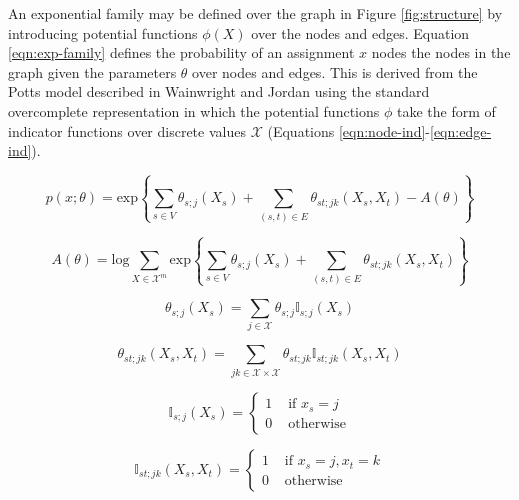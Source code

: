 \documentclass{article} %
\begin{document}
An exponential family may be defined over the graph in Figure \ref{fig:structure} by introducing potential functions $\phi(X)$ over the nodes and edges. Equation \ref{eqn:exp-family} defines the probability of an assignment $x$ nodes the nodes in the graph given the parameters $\theta$ over nodes and edges. This is derived from the Potts model described in Wainwright and Jordan \cite{wainwright08} using the standard overcomplete representation in which the potential functions $\phi$ take the form of indicator functions over discrete values $\mathcal{X}$ (Equations \ref{eqn:node-ind}-\ref{eqn:edge-ind}).

\begin{equation}
\label{eqn:exp-family}
p(x;\theta)
=
\textrm{exp}\left\{\sum_{s \in V}\theta_{s;j}(X_s) + \sum_{(s,t) \in E} \theta_{st;jk}(X_s,X_t) - A(\theta)\right\}
\end{equation}

\begin{equation}
\label{eqn:normalization}
A(\theta)
=
\textrm{log} \sum_{X \in \mathcal{X}^m} \textrm{exp}\left\{\sum_{s \in V}\theta_{s;j}(X_s) + \sum_{(s,t) \in E} \theta_{st;jk}(X_s,X_t)\right\}
\end{equation}

\noindent\begin{minipage}{.4\linewidth}
\begin{equation}
\label{eqn:node-theta}
\theta_{s;j}(X_s) = \sum_{j \in \mathcal{X}} \theta_{s;j} \mathbb{I}_{s;j}(X_s)
\end{equation}
\end{minipage}%
\begin{minipage}{.6\linewidth}
\begin{equation}
\label{eqn:edge-theta}
\theta_{st;jk}(X_s,X_t) = \sum_{jk \in \mathcal{X} \times \mathcal{X}} \theta_{st;jk} \mathbb{I}_{st;jk}(X_s,X_t)
\end{equation}
\end{minipage}

\noindent\begin{minipage}{.4\linewidth}
\begin{equation}
\label{eqn:node-ind}
\mathbb{I}_{s;j}(X_s) = \left\{ \begin{array}{rl}
 1 &\mbox{ if $x_s = j$} \\
 0 &\mbox{ otherwise}
\end{array} \right.
\end{equation}
\end{minipage}%
\begin{minipage}{.6\linewidth}
\begin{equation}
\label{eqn:edge-ind}
\mathbb{I}_{st;jk}(X_s,X_t) = \left\{ \begin{array}{rr}
 1 &\mbox{ if $x_s = j, x_t = k$} \\
 0 &\mbox{ otherwise}
\end{array} \right.
\end{equation}
\end{minipage}
\end{document}
